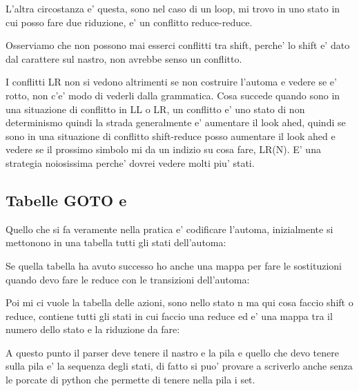 L'altra circostanza e' questa, sono nel caso di un loop, mi trovo in uno stato in cui posso fare due riduzione, e' un conflitto reduce-reduce.

Osserviamo che non possono mai esserci conflitti tra shift, perche' lo shift e' dato dal carattere sul nastro, non avrebbe senso un conflitto.

I conflitti LR non si vedono altrimenti se non costruire l'automa e vedere se e' rotto, non c'e' modo di vederli dalla grammatica. 
Cosa succede quando sono in una situazione di conflitto in LL o LR, un conflitto e' uno stato di non determinismo quindi la strada generalmente e' aumentare il look ahed, quindi se sono in una situazione di conflitto shift-reduce posso aumentare il look ahed e vedere se il prossimo simbolo mi da un indizio su cosa fare, LR(N). E' una strategia noiosissima perche' dovrei vedere molti piu' stati.

\subsection{Tabelle GOTO e }
Quello che si fa veramente nella pratica e' codificare l'automa, inizialmente si mettonono in una tabella tutti gli stati dell'automa:

Se quella tabella ha avuto successo ho anche una mappa per fare le sostituzioni quando devo fare le reduce con le transizioni dell'automa:


Poi mi ci vuole la tabella delle azioni, sono nello stato n ma qui cosa faccio shift o reduce, contiene tutti gli stati in cui faccio una reduce ed e' una mappa tra il numero dello stato e la riduzione da fare:

A questo punto il parser deve tenere il nastro e la pila e quello che devo tenere sulla pila e' la sequenza degli stati, di fatto si puo' provare a scriverlo anche senza le porcate di python che permette di tenere nella pila i set.